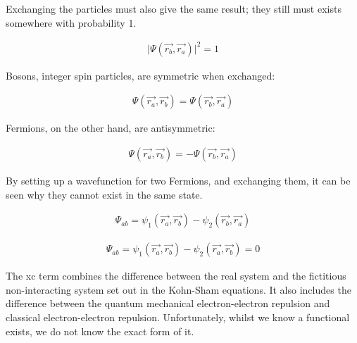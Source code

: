 Exchanging the particles must also give the same result; they still must exists somewhere with probability 1.

\begin{equation}
  \begin{split}
    \lvert \Psi(\vec{r_b}, \vec{r_a}) \rvert ^2 = 1
  \end{split}
  \label{eq:eqEulersFormula}
\end{equation}

Bosons, integer spin particles, are symmetric when exchanged:

\begin{equation}
  \begin{split}
  \Psi(\vec{r_a}, \vec{r_b}) = \Psi(\vec{r_b}, \vec{r_a})
  \end{split}
  \label{eq:eqEulersFormula}
\end{equation}

Fermions, on the other hand, are antisymmetric:

\begin{equation}
  \begin{split}
  \Psi(\vec{r_a}, \vec{r_b}) = - \Psi(\vec{r_b}, \vec{r_a})
  \end{split}
  \label{eq:eqEulersFormula}
\end{equation}

By setting up a wavefunction for two Fermions, and exchanging them, it can be seen why they cannot exist in the same state.

\begin{equation}
  \begin{split}
  \Psi_{ab} =  \psi_{1}(\vec{r_a}, \vec{r_b}) - \psi_{2}(\vec{r_b}, \vec{r_a})
  \end{split}
  \label{eq:eqEulersFormula}
\end{equation}

\begin{equation}
  \begin{split}
  \Psi_{ab} =  \psi_{1}(\vec{r_a}, \vec{r_b}) - \psi_{2}(\vec{r_a}, \vec{r_b}) = 0
  \end{split}
  \label{eq:eqEulersFormula}
\end{equation}

The \acrshort{xc} term combines the difference between the real system and the fictitious non-interacting system set out in the Kohn-Sham equations.  It also includes the difference between the quantum mechanical electron-electron repulsion and classical electron-electron repulsion.  Unfortunately, whilst we know a functional exists, we do not know the exact form of it\cite{ldaggaperdew}.


